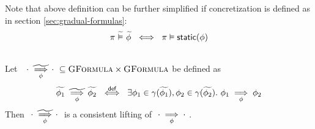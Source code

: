 Note that above definition can be further simplified if concretization is defined as in section \ref{sec:gradual-formulas}:
\begin{displaymath} 
\pi \,\,\widetilde{\vDash}\,\, \widetilde{\phi} ~\iff~ \pi \vDash \textsf{static}(\phi) 
\end{displaymath}

\begin{lemma}~\\
    Let $~~{\cdot} \,\,\underset{\phi}{\widetilde{\implies}}\, {\cdot}~ \subseteq \textsc{GFormula} \times \textsc{GFormula}$ be defined as
    \begin{displaymath} 
    {\widetilde{\phi_1}} \,\,\underset{\phi}{\widetilde{\implies}}\, {\widetilde{\phi_2}} ~\overset{\textsf{def}}{\iff}~ \exists \phi_1 \in \gamma(\widetilde{\phi_1}), \phi_2 \in \gamma(\widetilde{\phi_2}).~ {\phi_1} \underset{\phi}{\implies} {\phi_2}
    \end{displaymath}
    Then $~{\cdot} \,\,\underset{\phi}{\widetilde{\implies}}\, {\cdot}~$ is a consistent lifting of $~{\cdot} \underset{\phi}{\implies} {\cdot}~$.
\end{lemma}




